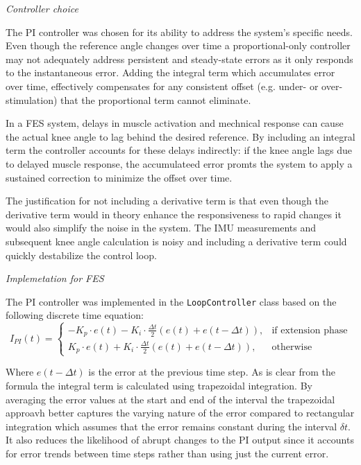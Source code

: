 \textit{Controller choice}

The PI controller was chosen for its ability to address the system's specific needs.  Even though the reference angle changes over time a proportional-only controller may not adequately address persistent and steady-state errors as it only responds to the instantaneous error. Adding the integral term which accumulates error over time, effectively compensates for any consistent offset (e.g. under- or over-stimulation) that the proportional term cannot eliminate. 


In a FES system, delays in muscle activation and mechnical response can cause the actual knee angle to lag behind the desired reference. By including an integral term the controller accounts for these delays indirectly: if the knee angle lags due to delayed muscle response, the accumulateed error promts the system to apply a sustained correction to minimize the offset over time.

The justification for not including a derivative term is that even though the derivative term would in theory enhance the responsiveness to rapid changes it would also simplify the noise in the system. The IMU measurements and subsequent knee angle calculation is noisy and including a derivative term could quickly destabilize the control loop.
\newline 

\textit{Implemetation for FES}

The PI controller was implemented in the \texttt{LoopController} class based on the following discrete time equation:
\begin{equation}
I_{PI}(t) = 
\begin{cases} 
-K_p \cdot e(t) - K_i \cdot \frac{\Delta t}{2} \left(e(t) + e(t-\Delta t)\right), & \text{if extension phase} \\
K_p \cdot e(t) + K_i \cdot \frac{\Delta t}{2} \left(e(t) + e(t-\Delta t)\right), & \text{otherwise}
\end{cases}
\end{equation}

Where \( e(t-\Delta t) \) is the error at the previous time step. As is clear from the formula the integral term is calculated using trapezoidal integration. By averaging the error values at the start and end of the interval the trapezoidal approavh better captures the varying nature of the error compared to rectangular integration which assumes that the error remains constant during the interval \(\delta t\). It also reduces the likelihood of abrupt changes to the PI output since it accounts for error trends between time steps rather than using just the current error.

